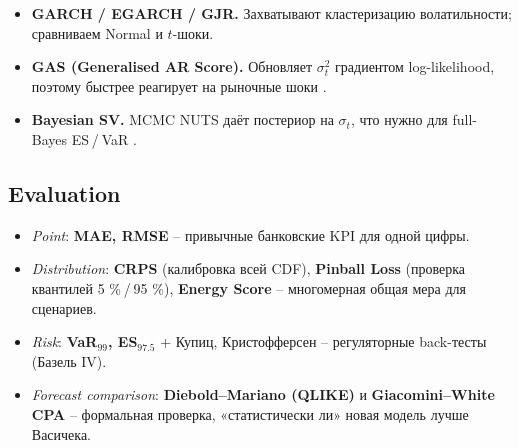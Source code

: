 \begin{itemize}
  \item \textbf{GARCH / EGARCH / GJR.}  Захватывают
        кластеризацию волатильности; сравниваем Normal и $t$-шоки.
  \item \textbf{GAS (Generalised AR Score).}  Обновляет
        $\sigma_{t}^{2}$ градиентом log-likelihood, поэтому быстрее реагирует
        на рыночные шоки \autocite{creal2013gas}.
  \item \textbf{Bayesian SV.}  MCMC NUTS даёт постериор на
        $\sigma_t$, что нужно для full-Bayes ES / VaR
        \autocite{alvarez2024bayesian}.
\end{itemize}

\subsection{Evaluation}

\begin{itemize}
  \item \textit{Point}: \textbf{MAE, RMSE} – привычные банковские KPI
        для одной цифры.
  \item \textit{Distribution}: \textbf{CRPS} (калибровка всей CDF),
        \textbf{Pinball Loss} (проверка квантилей 5 \% / 95 \%),
        \textbf{Energy Score} – многомерная общая мера для сценариев.
  \item \textit{Risk}: \textbf{VaR$_{99}$, ES$_{97.5}$} +
        Купиц, Кристофферсен – регуляторные back-тесты (Базель IV).
  \item \textit{Forecast comparison}: \textbf{Diebold–Mariano (QLIKE)}
        и \textbf{Giacomini–White CPA} – формальная проверка,
        «статистически ли» новая модель лучше Васичека.
\end{itemize}
